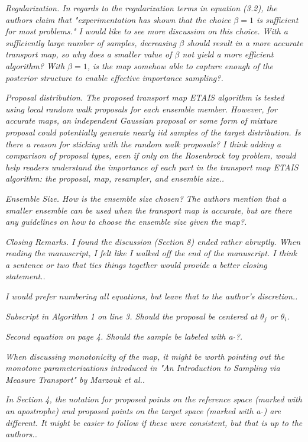 \documentclass{article}
\newcommand{\comment}[2]{\vspace{0.6cm}{\bf Comment:} {\it #1.}

\vspace{0.3cm}{\bf Answer:} #2}
\begin{document}
\comment{Regularization. In regards to the regularization terms in equation (3.2), the authors claim that "experimentation has shown that the choice $\beta=1$ is sufficient for most problems." I would like to see more discussion on this choice. With a sufficiently large number of samples, decreasing $\beta$ should result in a more accurate transport map, so why does a smaller value of $\beta$ not yield a more efficient algorithm? With $\beta=1$, is the map somehow able to capture enough of the posterior structure to enable effective importance sampling?}{}

\comment{Proposal distribution. The proposed transport map ETAIS algorithm is tested using local random walk proposals for each ensemble member. However, for accurate maps, an independent Gaussian proposal or some form of mixture proposal could potentially generate nearly iid samples of the target distribution. Is there a reason for sticking with the random walk proposals? I think adding a comparison of proposal types, even if only on the Rosenbrock toy problem, would help readers understand the importance of each part in the transport map ETAIS algorithm: the proposal, map, resampler, and ensemble size.}

\comment{Ensemble Size. How is the ensemble size chosen? The authors mention that a smaller ensemble can be used when the transport map is accurate, but are there any guidelines on how to choose the ensemble size given the map?}{}

\comment{Closing Remarks. I found the discussion (Section 8) ended rather abruptly. When reading the manuscript, I felt like I walked off the end of the manuscript. I think a sentence or two that ties things together would provide a better closing statement.}

\comment{I would prefer numbering all equations, but leave that to the author's discretion.}{} 

\comment{Subscript in Algorithm 1 on line 3. Should the proposal be centered at $\theta_j$ or $\theta_i$}{}

\comment{Second equation on page 4. Should the sample be labeled with a $\hat{ }$?}{}

\comment{When discussing monotonicity of the map, it might be worth pointing out the monotone parameterizations introduced in "An Introduction to Sampling via Measure Transport" by Marzouk et al.}{}

\comment{In Section 4, the notation for proposed points on the reference space (marked with an apostrophe) and proposed points on the target space (marked with a $\hat{ }$) are different. It might be easier to follow if these were consistent, but that is up to the authors.}{}
\end{document}
